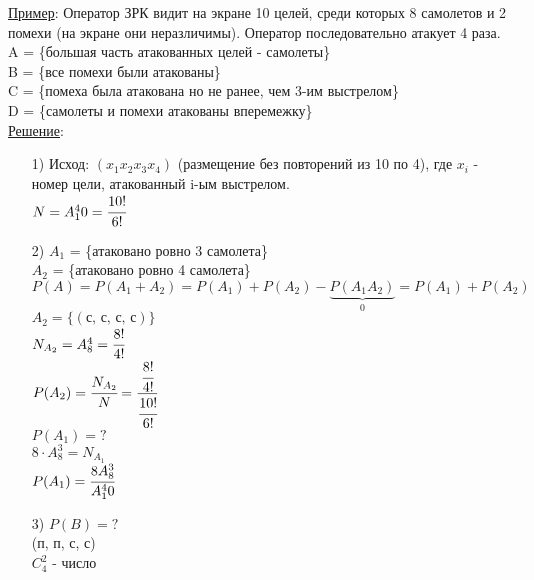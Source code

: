 \underline{Пример}: Оператор ЗРК видит на экране 10 целей, среди которых 8 самолетов и 2 помехи (на экране они неразличимы). Оператор последовательно атакует 4 раза. \\
A = \{большая часть атакованных целей - самолеты\} \\
B = \{все помехи были атакованы\} \\
C = \{помеха была атакована но не ранее, чем 3-им выстрелом\} \\
D = \{самолеты и помехи атакованы вперемежку\} \\
\underline{Решение}: \\
\begin{enumerate}
\item[1)] Исход: $(x_1 x_2 x_3 x_4)$ (размещение без повторений из 10 по 4), где $x_i$ - номер цели, атакованный i-ым выстрелом. \\
$N = A^4_10 = \cfrac{10!}{6!}$ \\

\item[2)] $A_1$ = \{атаковано ровно 3 самолета\} \\
$A_2$ = \{атаковано ровно 4 самолета\}
$P(A) = P(A_1 + A_2) = P(A_1) + P(A_2) - \underbrace{P(A_1 A_2)}_{\text{0}} = P(A_1) + P(A_2)$ \\
$A_2 = \{ (\text{с, с, с, с})\}$ \\
$N_{A_2} = A^4_8 = \cfrac{8!}{4!}$ \\
$P(A_2) = \cfrac{N_{A_2}}{N} = \cfrac{\cfrac{8!}{4!}}{\cfrac{10!}{6!}}$ \\
$P(A_1) = ?$ \\
$8 \cdot A^3_8 = N_{A_1}$ \\
$P(A_1) = \cfrac{8 A^3_8}{A^4_10}$ \\

\item[3)] $P(B) = ?$ \\
(п, п, с, с) \\
$C^2_4$ - число
\end{enumerate}


































